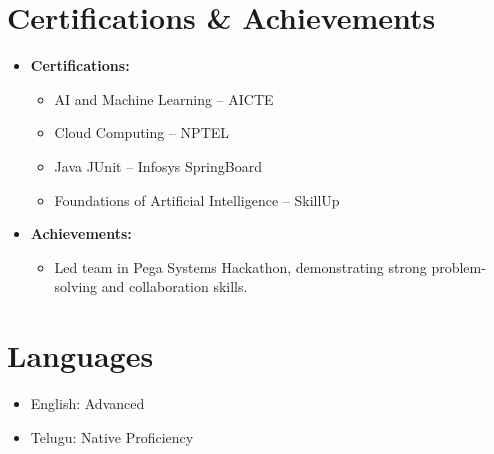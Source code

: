 \documentclass[article,11pt]{article}
\newcommand{\resumeItem}[1]{\item\small{#1}}
\newcommand{\resumeSubHeadingListStart}{\begin{itemize}[leftmargin=0.15in, label={}]}
\newcommand{\resumeSubHeadingListEnd}{\end{itemize}}
\newcommand{\resumeItemListStart}{\begin{itemize}[leftmargin=0.15in, label=\textbullet]}
\newcommand{\resumeItemListEnd}{\end{itemize}}
\begin{document}
\section{Certifications \& Achievements}
\resumeSubHeadingListStart
\resumeItem{\textbf{Certifications:}}
\resumeItemListStart
\resumeItem{AI and Machine Learning – AICTE}
\resumeItem{Cloud Computing – NPTEL}
\resumeItem{Java JUnit – Infosys SpringBoard}
\resumeItem{Foundations of Artificial Intelligence – SkillUp}
\resumeItemListEnd
\resumeItem{\textbf{Achievements:}}
\resumeItemListStart
\resumeItem{Led team in Pega Systems Hackathon, demonstrating strong problem-solving and collaboration skills.}
\resumeItemListEnd
\resumeSubHeadingListEnd

\section{Languages}
\resumeSubHeadingListStart
\resumeItem{English: Advanced}
\resumeItem{Telugu: Native Proficiency}
\resumeSubHeadingListEnd
\end{document}
